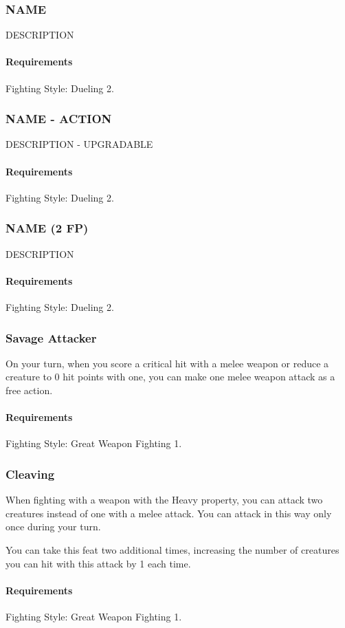\subsubsection{NAME} \label{feat::name}
    DESCRIPTION
    \paragraph{Requirements} Fighting Style: Dueling 2.
\subsubsection{NAME - ACTION} \label{feat::name}
    DESCRIPTION - UPGRADABLE
    \paragraph{Requirements} Fighting Style: Dueling 2.
\subsubsection{NAME (2 FP)} \label{feat::name}
    DESCRIPTION
    \paragraph{Requirements} Fighting Style: Dueling 2.
\subsubsection{Savage Attacker} \label{feat::savageattacker}
    On your turn, when you score a critical hit with a melee weapon or reduce a creature to 0 hit points with one, you can make one melee weapon attack as a free action.
    \paragraph{Requirements} Fighting Style: Great Weapon Fighting 1.
\subsubsection{Cleaving} \label{feat::cleaving}
    When fighting with a weapon with the Heavy property, you can attack two creatures instead of one with a melee attack.
    You can attack in this way only once during your turn.

    You can take this feat two additional times, increasing the number of creatures you can hit with this attack by 1 each time.
    \paragraph{Requirements} Fighting Style: Great Weapon Fighting 1.
